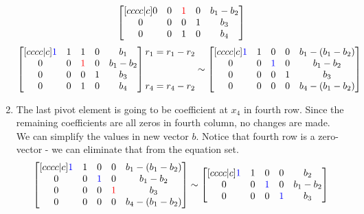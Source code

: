 \begin{enumerate}
\begin{equation}
\begin{bmatrix}[cccc|c]
    0 & 0 & \textcolor{red}{1} & 0 & b_1 - b_2 \\ 
    0 & 0 & 0 & 1 & b_3 \\ 
    0 & 0 & 1 & 0 & b_4
\end{bmatrix}
\end{equation}
\begin{equation}
\begin{bmatrix}[cccc|c]
    \textcolor{blue}{1} & 1 & 1 & 0 & b_1 \\ 
    0 & 0 & \textcolor{red}{1} & 0 & b_1 - b_2 \\ 
    0 & 0 & 0 & 1 & b_3 \\ 
    0 & 0 & 1 & 0 & b_4
\end{bmatrix}
\begin{matrix} r_1 = r_1 - r_2\\ \\ \\ r_4 = r_4 - r_2\end{matrix} \sim
\begin{bmatrix}[cccc|c]
    \textcolor{blue}{1} & 1 & 0 & 0 & b_1 - (b_1 - b_2) \\ 
    0 & 0 & \textcolor{blue}{1} & 0 & b_1 - b_2 \\ 
    0 & 0 & 0 & 1 & b_3 \\ 
    0 & 0 & 0 & 0 & b_4 - (b_1 - b_2)
\end{bmatrix}
\end{equation}

\item The last pivot element is going to be coefficient at $x_4$ in fourth row.
Since the remaining coefficients are all zeros in fourth column, no changes are made.
We can simplify the values in new vector $b$.
Notice that fourth row is a zero-vector - we can eliminate that from the equation set.
\begin{equation}
\begin{bmatrix}[cccc|c]
    \textcolor{blue}{1} & 1 & 0 & 0 & b_1 - (b_1 - b_2) \\ 
    0 & 0 & \textcolor{blue}{1} & 0 & b_1 - b_2 \\ 
    0 & 0 & 0 & \textcolor{red}{1} & b_3 \\ 
    0 & 0 & 0 & 0 & b_4 - (b_1 - b_2)
\end{bmatrix}
\sim
\begin{bmatrix}[cccc|c]
    \textcolor{blue}{1} & 1 & 0 & 0 & b_2 \\ 
    0 & 0 & \textcolor{blue}{1} & 0 & b_1 - b_2 \\ 
    0 & 0 & 0 & \textcolor{blue}{1} & b_3 \\ 
\end{bmatrix}
\end{equation}
\end{enumerate}

